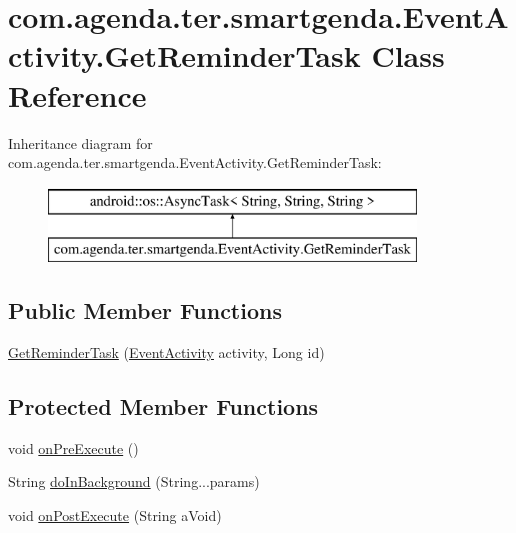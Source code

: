 \hypertarget{classcom_1_1agenda_1_1ter_1_1smartgenda_1_1_event_activity_1_1_get_reminder_task}{\section{com.\-agenda.\-ter.\-smartgenda.\-Event\-Activity.\-Get\-Reminder\-Task Class Reference}
\label{classcom_1_1agenda_1_1ter_1_1smartgenda_1_1_event_activity_1_1_get_reminder_task}
}
Inheritance diagram for com.\-agenda.\-ter.\-smartgenda.\-Event\-Activity.\-Get\-Reminder\-Task\-:\begin{figure}[H]
\begin{center}
\leavevmode
\includegraphics[height=2.000000cm]{classcom_1_1agenda_1_1ter_1_1smartgenda_1_1_event_activity_1_1_get_reminder_task}
\end{center}
\end{figure}
\subsection*{Public Member Functions}
\begin{DoxyCompactItemize}
\item 
\hyperlink{classcom_1_1agenda_1_1ter_1_1smartgenda_1_1_event_activity_1_1_get_reminder_task_ad3867277fc0ce6d8bcdef491a2060252}{Get\-Reminder\-Task} (\hyperlink{classcom_1_1agenda_1_1ter_1_1smartgenda_1_1_event_activity}{Event\-Activity} activity, Long id)
\end{DoxyCompactItemize}
\subsection*{Protected Member Functions}
\begin{DoxyCompactItemize}
\item 
void \hyperlink{classcom_1_1agenda_1_1ter_1_1smartgenda_1_1_event_activity_1_1_get_reminder_task_a78b15352a9e96d106f367934a5e8e501}{on\-Pre\-Execute} ()
\item 
String \hyperlink{classcom_1_1agenda_1_1ter_1_1smartgenda_1_1_event_activity_1_1_get_reminder_task_a3de62e312ff79eb89e00b9d3579a0d9a}{do\-In\-Background} (String...\-params)
\item 
void \hyperlink{classcom_1_1agenda_1_1ter_1_1smartgenda_1_1_event_activity_1_1_get_reminder_task_a1a09d2a3dadc7b8e4a40b52c6bf2c515}{on\-Post\-Execute} (String a\-Void)
\end{DoxyCompactItemize}


